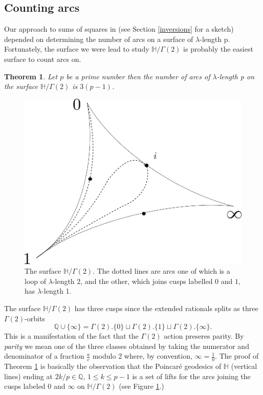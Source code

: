 \documentclass[12pt,a4paper]{amsart}
\newtheorem{thm}{Theorem}[section]
\def\HH{\mathbb{H}}
\def\g2{\Gamma(2)}
\def\xx{\HH/\g2}
\def\qqq{\mathbb{Q} \cup \{\infty\}}
\begin{document}
\subsection{Counting arcs}
Our approach to sums of squares in \cite{vlad} (see Section \ref{inversions} for a sketch) depended on determining the number of arcs on a surface
of $\lambda$-length p.
Fortunately, the surface we were lead to study $\xx$ is  probably
the easiest surface to count arcs on.

\begin{thm}\label{g2 arcs}
	Let $p$ be a prime number then the number of arcs of
	$\lambda$-length p on the surface
	$\xx$ is $3(p-1)$.
\end{thm}



 \begin{figure}[ht]
\begin{center}
\includegraphics[scale=.3]{3sphere.png} 
\end{center}
\caption{The surface $\xx$. The dotted lines are arcs one of which
is a loop of $\lambda$-length 2, 
and the other,
which joins cusps labelled $0$ and $1$, has $\lambda$-length 1.}
\label{3sphere}
\end{figure}

\noindent
The surface  $\xx$ has three cusps 
since the extended rationals  splits as three $\g2$-orbits
$$\qqq = \g2.\{0\} \sqcup  \g2. \{1\} \sqcup \g2. \{\infty\}.$$
This is a manifestation of the fact that the $\g2$ action 
preseres parity.
By \textit{parity} we mean one
of the three classes obtained by taking the 
numerator and denominator  of  a fraction $\frac{a}{c}$ modulo 2
where, by convention, $\infty = \frac{1}{0}$.
The proof of Theorem \ref{g2 arcs} is basically the observation that the Poincaré geodesics
of $\mathbb{H}$ (vertical lines) ending at $2k / p \in \mathbb{Q},\, 1\leq k \leq
p-1$ is a set of lifts for the arcs joining the cusps labeled $0$ and
$\infty$ on $\xx$ (see Figure \ref{3sphere}.)
\end{document}
